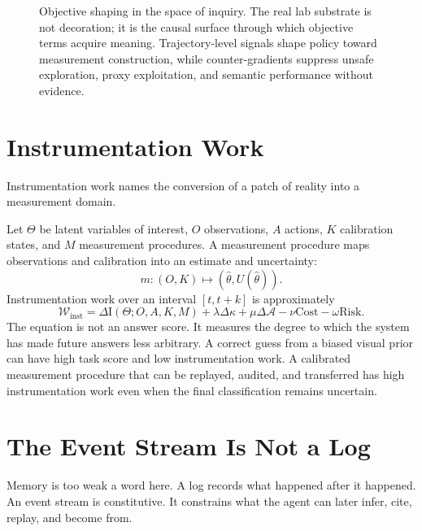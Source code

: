 \documentclass[11pt]{article}
\newcommand{\A}{\mathcal{A}}
\newcommand{\MI}{\mathrm{I}}
\newcommand{\Risk}{\mathrm{Risk}}
\newcommand{\Cost}{\mathrm{Cost}}
\begin{document}
\begin{figure}[p]
\vspace{0.45em}

\caption{Objective shaping in the space of inquiry. The real lab substrate is not decoration; it is the causal surface through which objective terms acquire meaning. Trajectory-level signals shape policy toward measurement construction, while counter-gradients suppress unsafe exploration, proxy exploitation, and semantic performance without evidence.}
\label{fig:objective-shaping}
\end{figure}



\section{Instrumentation Work}

Instrumentation work names the conversion of a patch of reality into a measurement domain.

Let $\Theta$ be latent variables of interest, $O$ observations, $A$ actions, $K$ calibration states, and $M$ measurement procedures. A measurement procedure maps observations and calibration into an estimate and uncertainty:
\begin{equation}
  m:(O,K)\mapsto (\hat{\theta}, U(\hat{\theta})).
\end{equation}
Instrumentation work over an interval $[t,t+k]$ is approximately
\begin{equation}
  \mathcal{W}_{\mathrm{inst}} = \Delta \MI(\Theta;O,A,K,M) + \lambda\Delta\kappa + \mu\Delta\A - \nu\Cost - \omega\Risk.
\end{equation}
The equation is not an answer score. It measures the degree to which the system has made future answers less arbitrary. A correct guess from a biased visual prior can have high task score and low instrumentation work. A calibrated measurement procedure that can be replayed, audited, and transferred has high instrumentation work even when the final classification remains uncertain.

\section{The Event Stream Is Not a Log}

Memory is too weak a word here. A log records what happened after it happened. An event stream is constitutive. It constrains what the agent can later infer, cite, replay, and become from.
\end{document}
